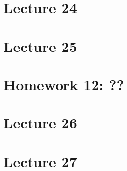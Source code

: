\documentclass{book}
\begin{document}
\chapter{Lecture 24}

\chapter{Lecture 25}

\chapter{Homework 12: ??}

\chapter{Lecture 26}

\chapter{Lecture 27}
\end{document}
